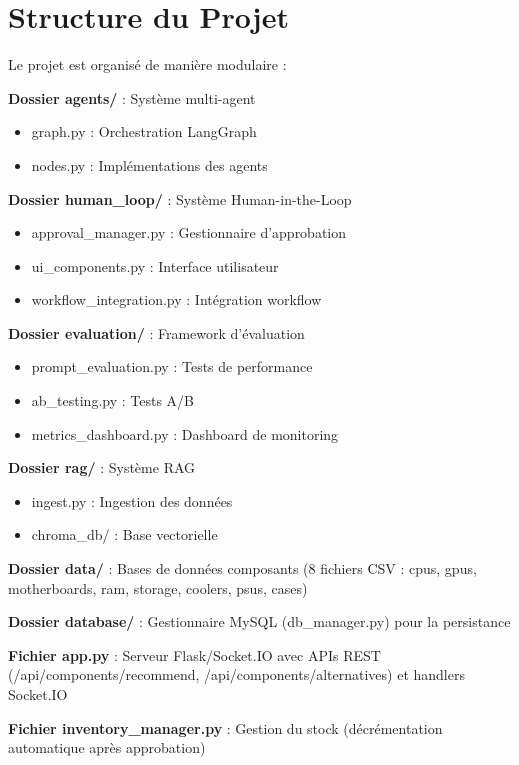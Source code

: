 \documentclass[12pt,a4paper]{article}
\begin{document}
\section{Structure du Projet}

Le projet est organis\'e de mani\`ere modulaire :

\textbf{Dossier agents/} : Syst\`eme multi-agent
\begin{itemize}
    \item graph.py : Orchestration LangGraph
    \item nodes.py : Impl\'ementations des agents
\end{itemize}

\textbf{Dossier human\_loop/} : Syst\`eme Human-in-the-Loop
\begin{itemize}
    \item approval\_manager.py : Gestionnaire d'approbation
    \item ui\_components.py : Interface utilisateur
    \item workflow\_integration.py : Int\'egration workflow
\end{itemize}

\textbf{Dossier evaluation/} : Framework d'\'evaluation
\begin{itemize}
    \item prompt\_evaluation.py : Tests de performance
    \item ab\_testing.py : Tests A/B
    \item metrics\_dashboard.py : Dashboard de monitoring
\end{itemize}

\textbf{Dossier rag/} : Syst\`eme RAG
\begin{itemize}
    \item ingest.py : Ingestion des donn\'ees
    \item chroma\_db/ : Base vectorielle
\end{itemize}

\textbf{Dossier data/} : Bases de donn\'ees composants (8 fichiers CSV : cpus, gpus, motherboards, ram, storage, coolers, psus, cases)

\textbf{Dossier database/} : Gestionnaire MySQL (db\_manager.py) pour la persistance

\textbf{Fichier app.py} : Serveur Flask/Socket.IO avec APIs REST (/api/components/recommend, /api/components/alternatives) et handlers Socket.IO

\textbf{Fichier inventory\_manager.py} : Gestion du stock (d\'ecr\'ementation automatique apr\`es approbation)
\end{document}
